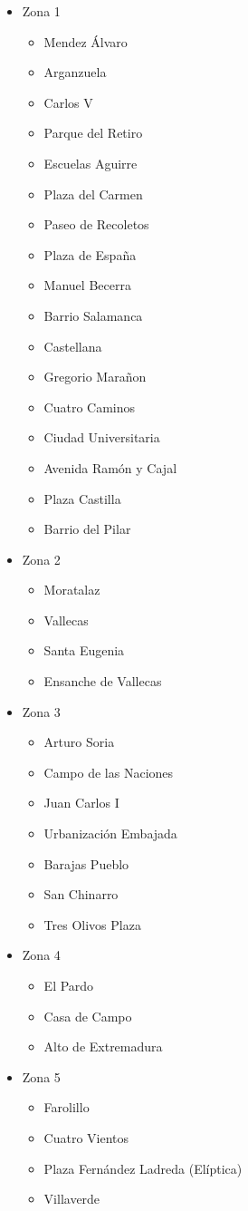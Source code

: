  
 \begin{itemize}
 	\item Zona 1
 	 \begin{itemize}
 		\item Mendez Álvaro
 		\item Arganzuela
 		\item Carlos V
 		\item Parque del Retiro
 		\item Escuelas Aguirre
 		\item Plaza del Carmen
 		\item Paseo de Recoletos
 		\item Plaza de España
 		\item Manuel Becerra
 		\item Barrio Salamanca
 		\item Castellana
 		\item Gregorio Marañon
 		\item Cuatro Caminos
 		\item Ciudad Universitaria
 		\item Avenida Ramón y Cajal
 		\item Plaza Castilla
 		\item Barrio del Pilar
 	\end{itemize}
 	\item Zona 2
 	 \begin{itemize}
 		\item Moratalaz
 		\item Vallecas
 		\item Santa Eugenia
 		\item Ensanche de Vallecas
 	\end{itemize}
 	\item Zona 3
 	 \begin{itemize}
 		\item Arturo Soria
 		\item Campo de las Naciones
 		\item Juan Carlos I
 		\item Urbanización Embajada
 		\item Barajas Pueblo
 		\item San Chinarro
 		\item Tres Olivos Plaza
 	\end{itemize}
 	\item Zona 4
 	 \begin{itemize}
 		\item El Pardo
 		\item Casa de Campo
 		\item Alto de Extremadura
 	\end{itemize}
 	\item Zona 5
 	 \begin{itemize}
 		\item Farolillo
 		\item Cuatro Vientos
 		\item Plaza Fernández Ladreda (Elíptica)
 		\item Villaverde
 	\end{itemize}
 \end{itemize}

